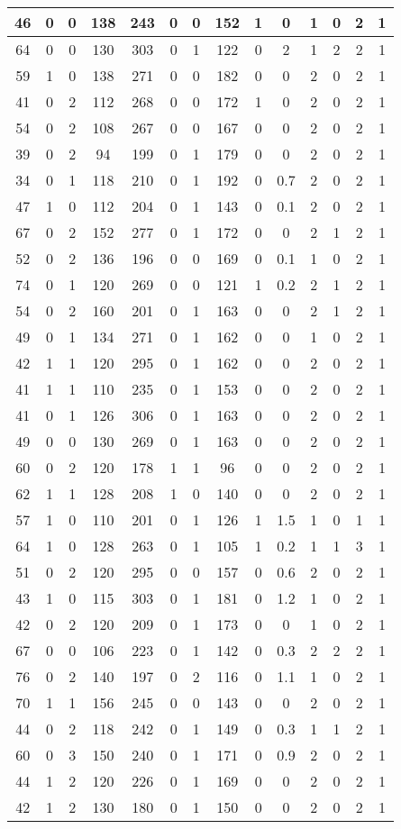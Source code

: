 \documentclass{article}
\begin{document}
\begin{tabular}{
|c|c|c|c|c|c|c|c|c|c|c|c|c|c|}
\hline
46&0&0&138&243&0&0&152&1&0&1&0&2&1 \\
\hline
64&0&0&130&303&0&1&122&0&2&1&2&2&1 \\
\hline
59&1&0&138&271&0&0&182&0&0&2&0&2&1 \\
\hline
41&0&2&112&268&0&0&172&1&0&2&0&2&1 \\
\hline
54&0&2&108&267&0&0&167&0&0&2&0&2&1 \\
\hline
39&0&2&94&199&0&1&179&0&0&2&0&2&1 \\
\hline
34&0&1&118&210&0&1&192&0&0.7&2&0&2&1 \\
\hline
47&1&0&112&204&0&1&143&0&0.1&2&0&2&1 \\
\hline
67&0&2&152&277&0&1&172&0&0&2&1&2&1 \\
\hline
52&0&2&136&196&0&0&169&0&0.1&1&0&2&1 \\
\hline
74&0&1&120&269&0&0&121&1&0.2&2&1&2&1 \\
\hline
54&0&2&160&201&0&1&163&0&0&2&1&2&1 \\
\hline
49&0&1&134&271&0&1&162&0&0&1&0&2&1 \\
\hline
42&1&1&120&295&0&1&162&0&0&2&0&2&1 \\
\hline
41&1&1&110&235&0&1&153&0&0&2&0&2&1 \\
\hline
41&0&1&126&306&0&1&163&0&0&2&0&2&1 \\
\hline
49&0&0&130&269&0&1&163&0&0&2&0&2&1 \\
\hline
60&0&2&120&178&1&1&96&0&0&2&0&2&1 \\
\hline
62&1&1&128&208&1&0&140&0&0&2&0&2&1 \\
\hline
57&1&0&110&201&0&1&126&1&1.5&1&0&1&1 \\
\hline
64&1&0&128&263&0&1&105&1&0.2&1&1&3&1 \\
\hline
51&0&2&120&295&0&0&157&0&0.6&2&0&2&1 \\
\hline
43&1&0&115&303&0&1&181&0&1.2&1&0&2&1 \\
\hline
42&0&2&120&209&0&1&173&0&0&1&0&2&1 \\
\hline
67&0&0&106&223&0&1&142&0&0.3&2&2&2&1 \\
\hline
76&0&2&140&197&0&2&116&0&1.1&1&0&2&1 \\
\hline
70&1&1&156&245&0&0&143&0&0&2&0&2&1 \\
\hline
44&0&2&118&242&0&1&149&0&0.3&1&1&2&1 \\
\hline
60&0&3&150&240&0&1&171&0&0.9&2&0&2&1 \\
\hline
44&1&2&120&226&0&1&169&0&0&2&0&2&1 \\
\hline
42&1&2&130&180&0&1&150&0&0&2&0&2&1 \\

\end{tabular}
\end{document}
